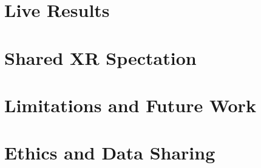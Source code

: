\documentclass[conference]{IEEEtran}
\begin{document}
\section{Live Results}

\section{Shared XR Spectation}

\section{Limitations and Future Work}

\section{Ethics and Data Sharing}



\end{document}
